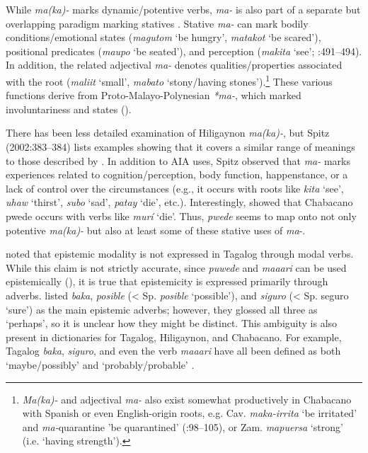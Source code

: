 \documentclass[output=paper]{langsci/langscibook}
\begin{document}
While \textit{ma(ka)-} marks dynamic/potentive verbs, \textit{ma-} is also part of a separate but overlapping paradigm marking statives \citep{Himmelmann2006}. Stative \textit{ma-} can mark bodily conditions/emotional states (\textit{magutom} ‘be hungry’, \textit{matakot} ‘be scared’), positional predicates (\textit{maupo} ‘be seated’), and perception (\textit{makita} ‘see’; \citealt{Himmelmann2006}:491–494). In addition, the related adjectival \textit{ma-} denotes qualities/properties associated with the root (\textit{maliit} ‘small’, \textit{mabato} ‘stony/having stones’).\footnote{\textit{Ma(ka)-} and adjectival \textit{ma-} also exist somewhat productively in Chabacano with Spanish or even English-origin roots, e.g. Cav. \textit{maka-irrita} ‘be irritated’ and \textit{ma-}quarantine 'be quarantined' (\citealt{Escalante2010}:98–105), or Zam. \textit{mapuersa} ‘strong’ (i.e. ‘having strength’).}  These various functions derive from Proto-Malayo-Polynesian \textit{*ma-}, which marked involuntariness and states (\citealt{EvansRoss2001}).

There has been less detailed examination of Hiligaynon \textit{ma(ka)-}, but Spitz (2002:383–384) lists examples showing that it covers a similar range of meanings to those described by \citet{Himmelmann2006}. In addition to AIA uses, Spitz observed that \textit{ma-} marks experiences related to cognition/perception, body function, happenstance, or a lack of control over the circumstances (e.g., it occurs with roots like \textit{kita} ‘see’, \textit{uhaw} ‘thirst’, \textit{subo} ‘sad’, \textit{patay} ‘die’, etc.). Interestingly, \citet[292]{Rubino2008} showed that Chabacano pwede occurs with verbs like \textit{murí} ‘die’. Thus, \textit{pwede} seems to map onto not only potentive \textit{ma(ka)-} but also at least some of these stative uses of \textit{ma}{}-.

\citet{AsarinaHolt2005} noted that epistemic modality is not expressed in Tagalog through modal verbs. While this claim is not strictly accurate, since \textit{puwede} and \textit{maaari} can be used epistemically (\citealt{SchachterOtanes1972}), it is true that epistemicity is expressed primarily through adverbs. \citet{BaderEtAl1994} listed \textit{baka}, \textit{posible} (< Sp. \textit{posible} ‘possible’), and \textit{siguro} (< Sp. seguro ‘sure’) as the main epistemic adverbs; however, they glossed all three as ‘perhaps’, so it is unclear how they might be distinct. This ambiguity is also present in dictionaries for Tagalog, Hiligaynon, and Chabacano. For example, Tagalog \textit{baka}, \textit{siguro}, and even the verb \textit{maaari} have all been defined as both ‘maybe/possibly’ and ‘probably/probable’ \citep[785]{English2008}.
\end{document}
